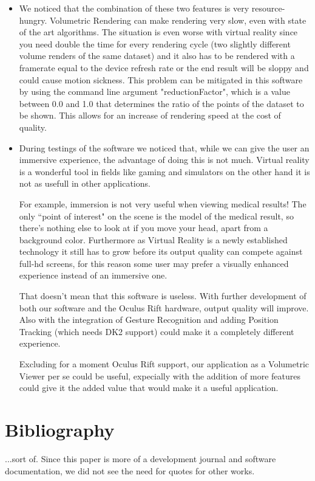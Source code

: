 \documentclass[11pt]{article} %
\begin{document}
\begin{itemize}
\item We noticed that the combination of these two features is very resource-hungry. Volumetric Rendering can make rendering very slow, even with state of the art algorithms. The situation is even worse with virtual reality since you need double the time for every rendering cycle  (two slightly different volume renders of the same dataset) and it also has to be rendered with a framerate equal to the device refresh rate or the end result will be sloppy and could cause motion sickness. This problem can be mitigated in this software by using the command line argument "reductionFactor", which is a value between 0.0 and 1.0 that determines the ratio of the points of the dataset to be shown. This allows for an increase of rendering speed at the cost of quality.

\item During testings of the software we noticed that, while we can give the user an immersive experience,
the advantage of doing this is not much. Virtual reality is a wonderful tool in fields like 
gaming and simulators on the other hand it is not as usefull in other applications.

For example, immersion is not very useful when viewing medical results!
The only ``point of interest" on the scene is the model of the medical result, so there's nothing else to 
look at if you move your head, apart from a background color. Furthermore as Virtual Reality is a newly established 
technology it still has to grow before its output quality can compete against full-hd screens, 
for this reason some user may prefer a visually enhanced experience instead of an immersive one.

That doesn't mean  that this software is useless. With further development of both our software and the Oculus Rift hardware, output quality will improve. Also with the integration of Gesture Recognition and adding Position Tracking (which needs DK2 support) could make it a completely different experience.

Excluding for a moment Oculus Rift support, our application as a Volumetric Viewer per se could be useful, expecially with the addition of more features could give it the added value that would make it a useful application.

\end{itemize}

\newpage

\section{Bibliography}
...sort of. Since this paper is more of a development journal and software documentation, we did not see the need for quotes for other works.
\end{document}
